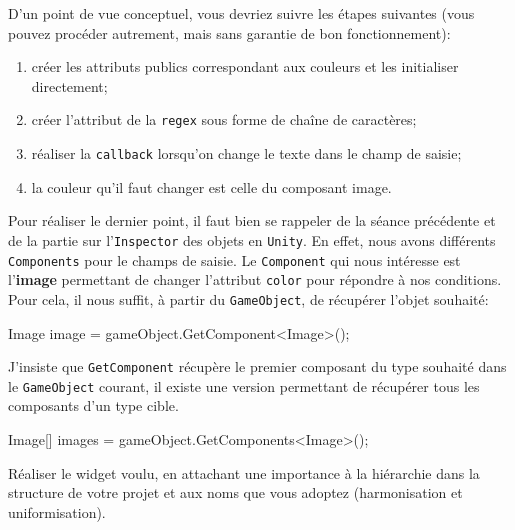 \documentclass[a4paper,10pt]{article}
\newenvironment{info}%
{\begin{tcolorbox}[breakable,colback=green!5!white,colframe=green!75!black,title=Information]}%
{\end{tcolorbox}}
\begin{document}
D'un point de vue conceptuel, vous devriez suivre les étapes suivantes (vous pouvez procéder autrement, mais sans garantie de bon fonctionnement):%
\begin{enumerate}
	\item créer les attributs publics correspondant aux couleurs et les initialiser directement;
	\item créer l'attribut de la \texttt{regex} sous forme de chaîne de caractères;
	\item réaliser la \texttt{callback} lorsqu'on change le texte dans le champ de saisie;
	\item la couleur qu'il faut changer est celle du composant image.
\end{enumerate}

\begin{info}
Pour réaliser le dernier point, il faut bien se rappeler de la séance précédente et de la partie sur l'\texttt{Inspector} des objets en \texttt{Unity}. En effet, %
nous avons différents \texttt{Components} pour le champs de saisie. Le \texttt{Component} qui nous intéresse est l'\textbf{image} permettant de changer l'attribut \texttt{color} pour répondre à nos conditions. Pour cela, il nous suffit, à partir du \texttt{GameObject}, de récupérer l'objet souhaité:

\begin{csharp}
Image image = gameObject.GetComponent<Image>();
\end{csharp}

J'insiste que \texttt{GetComponent} récupère le premier composant du type souhaité dans le \texttt{GameObject} courant, il existe une version permettant de récupérer tous les composants d'un type cible.
\begin{csharp}
Image[] images = gameObject.GetComponents<Image>();
\end{csharp}
\end{info}

Réaliser le widget voulu, en attachant une importance à la hiérarchie dans la structure de votre projet et aux noms que vous adoptez (harmonisation et uniformisation).
\end{document}
